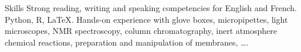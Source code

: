 
\begin{rubric}{Skills}
\entry*[Languages]
	Strong reading, writing and speaking competencies for English and French.
	Python, R, \LaTeX.
\entry*[Laboratory]
	Hands-on experience with glove boxes, micropipettes, light microscopes, NMR spectroscopy, column chromatography, inert atmosphere chemical reactions, preparation and manipulation of membranes, \ldots.
	
\end{rubric}
